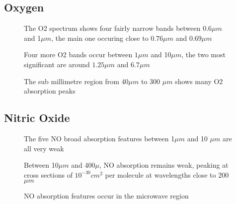 \documentclass[12pt]{article}
\begin{document}
\subsection{Oxygen}

\vspace*{11.5cm}
\begin{figure}[htb]
\caption{The O2 spectrum shows four fairly narrow bands between $0.6 \mu m$ and 1$\mu m$, the
main one occuring close to $0.76 \mu m$ and $0.69 \mu m$}
\end{figure}
\newpage

\vspace*{11.5cm}
\begin{figure}[htb]
\caption{Four more O2 bands  occur between $1 \mu m$ and 10$\mu m$, the
two most significant are around $1.25 \mu m$ and $6.7 \mu m$}
\end{figure}
\newpage


\vspace*{11.5cm}
\begin{figure}[htb]
\caption{The sub millimetre region from 40$\mu m$ to 300 $\mu m$ shows many O2
absorption peaks }
\end{figure}
\newpage

\subsection{Nitric Oxide}

\vspace*{11.5cm}
\begin{figure}[htb]
\caption{The five NO broad absorption features between 1$\mu m$ and 10 $\mu m$
are all very weak}
\end{figure}
\newpage

\vspace*{11.5cm}
\begin{figure}[htb]
\caption{Between 10$\mu m$ and 400$\mu$, NO absorption remains
weak, peaking at cross sections of $10^{-30} cm^2$ per molecule at wavelengths
close to 200$\mu m$}
\end{figure}
\newpage


\vspace*{11.5cm}
\begin{figure}[htb]
\caption{NO absorption features occur in the microwave region}
\end{figure}
\newpage
\end{document}
